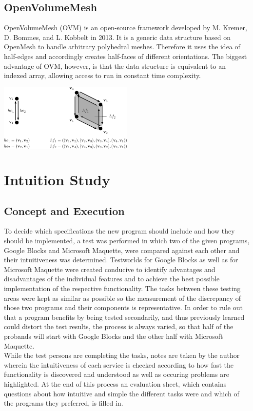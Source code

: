\documentclass{report}
\begin{document}
	\section[OpenVolumeMesh]{OpenVolumeMesh \textsc{\small{\cite{OVM}}}}
	\startsection
		OpenVolumeMesh (OVM) is an open-source framework developed by M. Kremer, D. Bommes, and L. Kobbelt in 2013. It is a generic data structure based on OpenMesh to handle arbitrary polyhedral meshes. Therefore it uses the idea of half-edges and accordingly creates half-faces of different orientations. The biggest advantage of OVM, however, is that the data structure is equivalent to an indexed array, allowing access to run in constant time complexity. \\
		\begin{center}
			\includegraphics[width=0.5\textwidth]{halfedge_halfface.png} 
		\end{center}
	\closesection

\chapter{Intuition Study}

	\section{Concept and Execution}	
	\startsection				
		To decide which specifications the new program should include and how they should be implemented, a test was performed in which two of the given programs, Google Blocks and Microsoft Maquette, were compared against each other and their intuitiveness was determined. Testworlds for Google Blocks as well as for Microsoft Maquette were created conducive to identify advantages and disadvantages of the individual features and to achieve the best possible implementation of the respective functionality. The tasks between these testing areas were kept as similar as possible so the measurement of the discrepancy of those two programs and their components is representative. In order to rule out that a program benefits by being tested secondarily, and thus previously learned could distort the test results, the process is always varied, so that half of the probands will start with Google Blocks and the other half with Microsoft Maquette. \\
		While the test persons are completing the tasks, notes are taken by the author wherein the intuitiveness of each service is checked according to how fast the functionality is discovered and understood as well as occuring problems are highlighted. At the end of this process an evaluation sheet, which contains questions about how intuitive and simple the different tasks were and which of the programs they preferred, is filled in.
	\closesection
\end{document}

